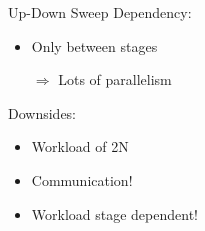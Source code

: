 
\begin{frame}{Up-Down Sweep}
Dependency:
\begin{itemize}
 \item Only between stages
 \item[$\Rightarrow$] Lots of parallelism
\end{itemize}
\vspace{10pt}
Downsides:
\begin{itemize}
 \item Workload of 2N
 \item Communication!
 \item Workload stage dependent!
\end{itemize}

\end{frame}
